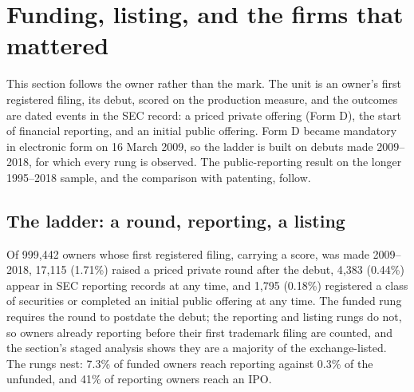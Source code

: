 \section{Funding, listing, and the firms that mattered}\label{sec:secevents}

This section follows the owner rather than the mark. The unit is an owner's
first registered filing, its debut, scored on the production measure, and
the outcomes are dated events in the SEC record: a priced private offering
(Form D), the start of financial reporting, and an initial public offering.
Form D became mandatory in electronic form on 16 March 2009, so the ladder
is built on debuts made 2009--2018, for which every rung is observed. The
public-reporting result on the longer 1995--2018 sample, and the comparison
with patenting, follow.

\subsection{The ladder: a round, reporting, a listing}\label{sec:ladder}

Of 999{,}442 owners whose first registered filing, carrying a score, was
made 2009--2018,
17{,}115 (1.71\%) raised a priced private round after the debut, 4{,}383
(0.44\%) appear in SEC reporting records at any time, and 1{,}795
(0.18\%) registered a class of securities or completed an initial public
offering at any time. The funded rung requires the round to postdate the
debut; the reporting and listing rungs do not, so owners already reporting
before their first trademark filing are counted, and the section's staged
analysis shows they are a majority of the exchange-listed. The rungs nest: 7.3\% of funded owners reach reporting against
0.3\% of the unfunded, and 41\% of reporting owners reach an IPO.

